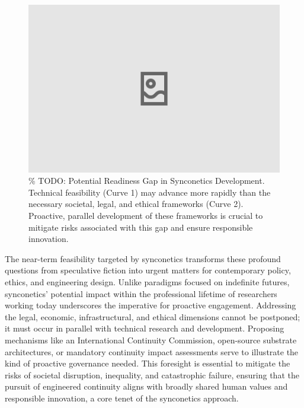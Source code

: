 \documentclass[10pt]{article}
\begin{document}
\begin{sloppypar}
  \begin{figure}[ht!]
    \centering
    \includegraphics[width=\textwidth]{figures/readiness-gap.png}
    \caption{\% TODO: Potential Readiness Gap in Synconetics Development. Technical feasibility (Curve 1) may advance more rapidly than the necessary societal, legal, and ethical frameworks (Curve 2). Proactive, parallel development of these frameworks is crucial to mitigate risks associated with this gap and ensure responsible innovation.}
    \label{fig:readiness-gap}
  \end{figure}

  The near-term feasibility targeted by synconetics transforms these profound questions from speculative fiction into urgent matters for contemporary policy, ethics, and engineering design. Unlike paradigms focused on indefinite futures, synconetics’ potential impact within the professional lifetime of researchers working today underscores the imperative for proactive engagement. Addressing the legal, economic, infrastructural, and ethical dimensions cannot be postponed; it must occur in parallel with technical research and development. Proposing mechanisms like an International Continuity Commission, open-source substrate architectures, or mandatory continuity impact assessments serve to illustrate the kind of proactive governance needed. This foresight is essential to mitigate the risks of societal disruption, inequality, and catastrophic failure, ensuring that the pursuit of engineered continuity aligns with broadly shared human values and responsible innovation, a core tenet of the synconetics approach.



\end{sloppypar}
\end{document}
